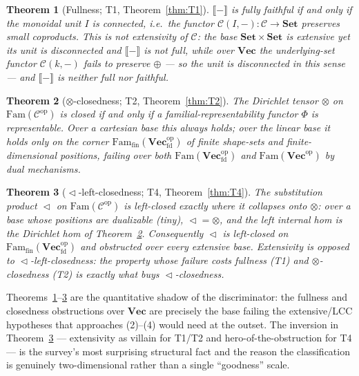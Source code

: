 \documentclass[11pt]{amsart}
\theoremstyle{plain}
\newtheorem{theorem}{Theorem}[section]
\theoremstyle{definition}
\theoremstyle{remark}
\newcommand{\C}{\mathcal{C}}
\newcommand{\Set}{\mathbf{Set}}
\newcommand{\Vect}{\mathbf{Vec}}
\newcommand{\Vecfd}{\mathbf{Vec}_{\mathrm{fd}}}
\newcommand{\Fam}{\mathrm{Fam}}
\newcommand{\ext}[1]{\llbracket #1 \rrbracket}
\renewcommand{\lhd}{\vartriangleleft}
\newcommand{\op}{\mathrm{op}}
\begin{document}
\begin{theorem}[Fullness; T1, Theorem~\ref{thm:T1}]\label{thm:introT1}
$\ext{-}$ is fully faithful if and only if the monoidal unit $I$ is \emph{connected}, i.e.\ the
functor $\C(I,-)\colon\C\to\Set$ preserves small coproducts. This is \emph{not} extensivity of $\C$:
the base $\Set\times\Set$ is extensive yet its unit is disconnected and $\ext{-}$ is not full, while
over $\Vect$ the underlying-set functor $\C(k,-)$ fails to preserve $\oplus$ --- so the unit is
disconnected in this sense --- and $\ext{-}$ is neither full nor faithful.
\end{theorem}

\begin{theorem}[$\otimes$-closedness; T2, Theorem~\ref{thm:T2}]\label{thm:introT2}
The Dirichlet tensor $\otimes$ on $\Fam(\C^\op)$ is closed if and only if a familial-representability
functor $\Phi$ is representable. Over a cartesian base this always holds; over the linear base it
holds \emph{only} on the corner $\Fam_{\mathrm{fin}}(\Vecfd^\op)$ of finite shape-sets and
finite-dimensional positions, failing over both $\Fam(\Vecfd^\op)$ and $\Fam(\Vect^\op)$ by dual
mechanisms.
\end{theorem}

\begin{theorem}[$\lhd$-left-closedness; T4, Theorem~\ref{thm:T4}]\label{thm:introT4}
The substitution product $\lhd$ on $\Fam(\C^\op)$ is left-closed exactly where it \emph{collapses
onto} $\otimes$: over a base whose positions are dualizable (\emph{tiny}), $\lhd=\otimes$, and the
left internal hom is the Dirichlet hom of Theorem~\ref{thm:introT2}. Consequently $\lhd$ is
left-closed on $\Fam_{\mathrm{fin}}(\Vecfd^\op)$ and obstructed over every extensive base. Extensivity
is \emph{opposed} to $\lhd$-left-closedness: the property whose failure costs fullness (T1) and
$\otimes$-closedness (T2) is exactly what buys $\lhd$-closedness.
\end{theorem}

Theorems~\ref{thm:introT1}--\ref{thm:introT4} are the quantitative shadow of the discriminator: the
fullness and closedness obstructions over $\Vect$ are precisely the base failing the extensive/LCC
hypotheses that approaches (2)--(4) would need at the outset. The inversion in
Theorem~\ref{thm:introT4} --- extensivity as villain for T1/T2 and hero-of-the-obstruction for T4
--- is the survey's most surprising structural fact and the reason the classification is genuinely
two-dimensional rather than a single ``goodness'' scale.
\end{document}
